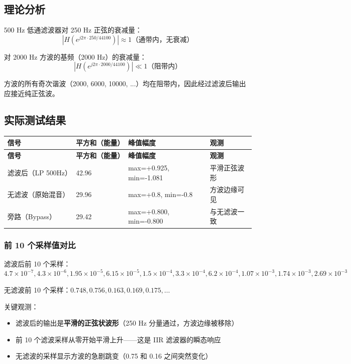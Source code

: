 ﻿\documentclass[12pt,a4paper,oneside]{ctexbook}
\begin{document}
\subsection{理论分析}

500 Hz 低通滤波器对 250 Hz 正弦的衰减量：
\[
|H(e^{j2\pi\cdot250/44100})| \approx 1 \text{（通带内，无衰减）}
\]

对 2000 Hz 方波的基频（2000 Hz）的衰减量：
\[
|H(e^{j2\pi\cdot2000/44100})| \ll 1 \text{（阻带内）}
\]

方波的所有奇次谐波（2000, 6000, 10000, ...）均在阻带内，因此经过滤波后输出应接近纯正弦波。

\subsection{实际测试结果}

\begin{longtable}{p{3cm}p{3cm}p{3cm}p{5cm}}
    \toprule
    \textbf{信号} & \textbf{平方和（能量）} & \textbf{峰值幅度} & \textbf{观测} \\
    \midrule
    \endfirsthead
    \toprule
    \textbf{信号} & \textbf{平方和（能量）} & \textbf{峰值幅度} & \textbf{观测} \\
    \midrule
    \endhead
    \bottomrule
    \endfoot
    滤波后（LP 500Hz） & 42.96 & max=+0.925, min=-1.081 & 平滑正弦波形 \\
    无滤波（原始混音） & 29.96 & max=+0.8, min=-0.8 & 方波边缘可见 \\
    旁路（Bypass） & 29.42 & max=+0.800, min=-0.800 & 与无滤波一致 \\
    \bottomrule
\end{longtable}

\subsubsection{前 10 个采样值对比}

滤波后前 10 个采样：\(4.7\times10^{-7}, 4.3\times10^{-6}, 1.95\times10^{-5}, 6.15\times10^{-5}, 1.5\times10^{-4}, 3.3\times10^{-4}, 6.2\times10^{-4}, 1.07\times10^{-3}, 1.74\times10^{-3}, 2.69\times10^{-3}\)

无滤波前 10 个采样：\(0.748, 0.756, 0.163, 0.169, 0.175, \ldots\)

关键观测：
\begin{itemize}
    \item 滤波后的输出是\textbf{平滑的正弦状波形}（250 Hz 分量通过，方波边缘被移除）
    \item 前 10 个滤波采样从零开始平滑上升——这是 IIR 滤波器的瞬态响应
    \item 无滤波的采样显示方波的急剧跳变（0.75 和 0.16 之间突然变化）
\end{itemize}
\end{document}
